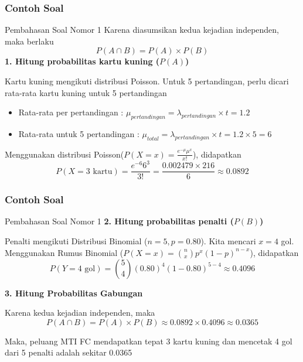 \documentclass[]{beamer}
\begin{document}
\begin{frame}
\frametitle{Contoh Soal}
\scriptsize
    \begin{exampleblock}{Pembahasan Soal Nomor 1}
        Karena diasumsikan kedua kejadian independen, maka berlaku
        \begin{equation*}
            P(A\cap B) = P(A) \times P(B)
        \end{equation*}
        \textbf{1. Hitung probabilitas kartu kuning ($P(A)$)}
        
        \bigskip
        
        Kartu kuning mengikuti distribusi Poisson. Untuk 5 pertandingan, perlu dicari rata-rata kartu kuning untuk 5 pertandingan
        \begin{itemize}
            \item Rata-rata per pertandingan : $\mu_{pertandingan}=\lambda_{pertandingan} \times t =1.2$
            \item Rata-rata untuk 5 pertandingan : $\mu_{total}=\lambda_{pertandingan} \times t = 1.2\times 5 = 6$
        \end{itemize}
        Menggunakan distribusi Poisson($P(X=x) = \frac{e^{-\mu} \mu^x}{x!}$), didapatkan
        \begin{equation*}
            P(X=3 \text{ kartu}) = \frac{e^{-6} 6^3}{3!} = \frac{0.002479 \times 216}{6} \approx 0.0892
        \end{equation*}
    \end{exampleblock}
\end{frame}

\begin{frame}
    \scriptsize
    \frametitle{Contoh Soal}
    \begin{exampleblock}{Pembahasan Soal Nomor 1}
        \textbf{2. Hitung probabilitas penalti ($P(B)$)}

        \bigskip
        
        Penalti mengikuti Distribusi Binomial ($n=5, p=0.80$). Kita mencari $x=4$ gol. Menggunakan Rumus Binomial ($P(X=x) = \binom{n}{x} p^x (1-p)^{n-x}$), didapatkan
        \begin{equation*}
            P(Y=4 \text{ gol}) = \binom{5}{4} (0.80)^4 (1-0.80)^{5-4} \approx 0.4096
        \end{equation*}

        \textbf{3. Hitung Probabilitas Gabungan}

        \bigskip
        
        Karena kedua kejadian independen, maka
        \begin{equation*}
            P(A \cap B) = P(A) \times P(B) \approx 0.0892 \times 0.4096 \approx \mathbf{0.0365}
        \end{equation*}
        
        \bigskip
        
        Maka, peluang MTI FC mendapatkan tepat 3 kartu kuning dan mencetak 4 gol dari 5 penalti adalah sekitar 0.0365
    \end{exampleblock}
\end{frame}
\end{document}
